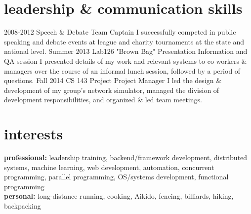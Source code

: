 \documentclass[]{mills-cv} %
\begin{document}

\section{leadership \& communication skills}

\begin{entrylist}
\entry
{2008-2012}
{Speech \& Debate}
{Team Captain}
{I successfully competed in public speaking and debate events at league and charity tournaments at the state and national level.}
\entry
{Summer 2013}
{Lab126 "Brown Bag" Presentation}
{Information and QA session}
{I presented details of my work and relevant systems to co-workers \& managers over the course of an informal lunch session, followed by a period of questions.}
\entry
{Fall 2014}
{CS 143 Project}
{Project Manager}
{I led the design \& development of my group's network simulator, managed the division of development responsibilities, and organized \& led team meetings.}
\end{entrylist}


\section{interests}

\textbf{professional:} leadership training, backend/framework development, distributed systems, machine learning, web development, automation, concurrent programming, parallel programming, OS/systems development, functional programming
\\
\textbf{personal:} long-distance running, cooking, Aikido, fencing, billiards, hiking, backpacking
\end{document}
